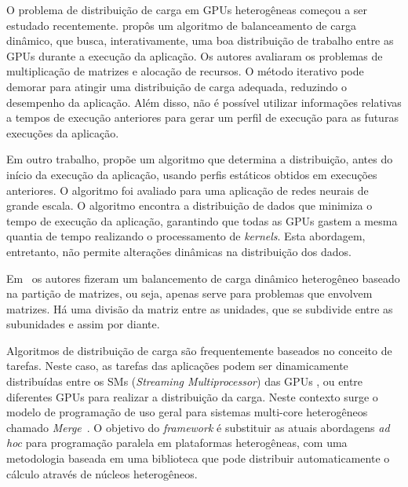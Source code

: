 O problema de distribuição de carga em GPUs heterogêneas começou a ser estudado
recentemente. \citep{acosta} propôs um algoritmo de balanceamento de carga
dinâmico, que busca, interativamente, uma boa distribuição de trabalho entre as
GPUs durante a execução da aplicação. Os autores avaliaram os problemas de
multiplicação de matrizes e alocação de recursos. O método iterativo pode
demorar para atingir uma distribuição de carga adequada, reduzindo o desempenho
da aplicação. Além disso, não é possível utilizar informações relativas a tempos
de execução anteriores para gerar um perfil de execução para as futuras
execuções da aplicação.

Em outro trabalho, \citep{raphael} propõe um algoritmo que determina a
distribuição, antes do início da execução da aplicação, usando perfis estáticos
obtidos em execuções anteriores. O algoritmo foi avaliado para uma aplicação de
redes neurais de grande escala. O algoritmo encontra a distribuição de dados que
minimiza o tempo de execução da aplicação, garantindo que todas as GPUs gastem a
mesma quantia de tempo realizando o processamento de \emph{kernels}. Esta
abordagem, entretanto, não permite alterações dinâmicas na distribuição dos
dados.

Em~\citep{Clarke:2012:HPA:2402420.2402479}  os autores fizeram um balancemento de carga dinâmico heterogêneo baseado na partição de matrizes, ou seja, apenas serve para problemas que envolvem matrizes. Há uma divisão da matriz entre as unidades, que se subdivide entre as subunidades e assim por diante. 


Algoritmos de distribuição de carga são frequentemente baseados no conceito de
tarefas. Neste caso, as tarefas das aplicações podem ser dinamicamente
distribuídas entre os SMs (\textit{Streaming Multiprocessor}) das GPUs
\citep{dynamicLoad}, ou entre diferentes GPUs \citep{starpu} para realizar a
distribuição da carga. Neste contexto surge o modelo de programação de uso geral
para sistemas multi-core heterogêneos chamado \textit{Merge}~\citep{merge}. O
objetivo do \textit{framework} é substituir as atuais abordagens \textit{ad hoc}
para programação paralela em plataformas heterogêneas, com uma metodologia
baseada em uma biblioteca que pode distribuir automaticamente o cálculo através
de núcleos heterogêneos.

